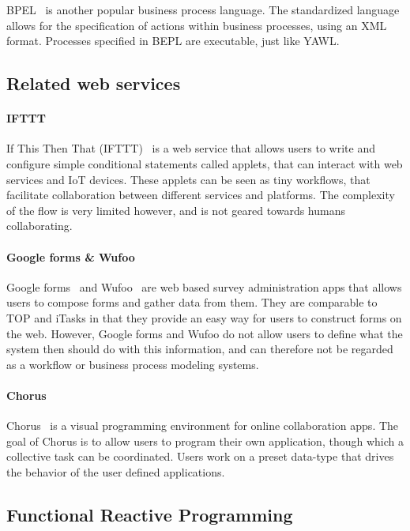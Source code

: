 BPEL~\cite{bpel} is another popular business process language. The standardized
language allows for the specification of actions within business processes,
using an XML format. Processes specified in BEPL are executable, just like YAWL.


\subsection{Related web services}


\paragraph{IFTTT}

If This Then That (IFTTT)~\cite{IFTTT} is a web service that allows users to write and
configure simple conditional statements called applets, that can interact with
web services and IoT devices. These applets can be seen as tiny workflows, that
facilitate collaboration between different services and platforms. The
complexity of the flow is very limited however, and is not geared towards humans
collaborating.

\paragraph{Google forms \& Wufoo}

Google forms~\cite{googleforms} and Wufoo~\cite{wufoo} are web based survey administration apps that allows
users to compose forms and gather data from them. They are comparable to TOP and
iTasks in that they provide an easy way for users to construct forms on the web.
However, Google forms and Wufoo do not allow users to define what the system
then should do with this information, and can therefore not be regarded as a
workflow or business process modeling systems.

\paragraph{Chorus} %

Chorus~\cite{chen2017chorus} is a visual programming environment for online
collaboration apps. The goal of Chorus is to allow users to program their own
application, though which a collective task can be coordinated. Users work on a
preset data-type that drives the behavior of the user defined applications.


\subsection{Functional Reactive Programming}

